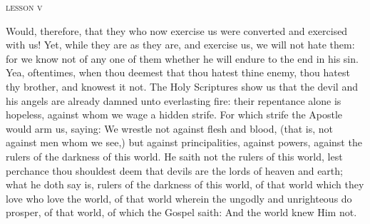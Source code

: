 \bigskip\bigskip
{
\begin{center}{\textsc{lesson v}}\end{center}

\begin{parcolumns}[rulebetween,colwidths={1=250pt}]{2}
{Would, therefore, that they who now exercise us were converted and exercised with us! Yet, while they are as they are, and exercise us, we will not hate them: for we know not of any one of them whether he will endure to the end in his sin. Yea, oftentimes, when thou deemest that thou hatest thine enemy, thou hatest thy brother, and knowest it not. The Holy Scriptures show us that the devil and his angels are already damned unto everlasting fire: their repentance alone is hopeless, against whom we wage a hidden strife. For which strife the Apostle would arm us, saying: We wrestle not against flesh and blood, (that is, not against men whom we see,) but against principalities, against powers, against the rulers of the darkness of this world. He saith not the rulers of this world, lest perchance thou shouldest deem that devils are the lords of heaven and earth; what he doth say is, rulers of the darkness of this world, of that world which they love who love the world, of that world wherein the ungodly and unrighteous do prosper, of that world, of which the Gospel saith: And the world knew Him not.}
\end{parcolumns}
}

\bigskip\bigskip

